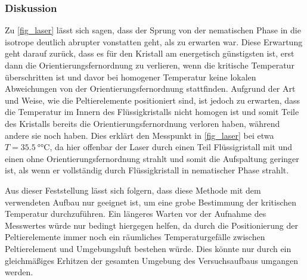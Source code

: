 \documentclass[
	a4paper,
	12pt,
	pagesize,
	ngerman
]{scrartcl}
\begin{document}
	\subsubsection{Diskussion}

	Zu \cref{fig_laser} lässt sich sagen, dass der Sprung von der nematischen Phase in die isotrope deutlich abrupter vonstatten geht, als zu erwarten war.
	Diese Erwartung geht darauf zurück, dass es für den Kristall am energetisch günstigsten ist, erst dann die Orientierungsfernordnung zu verlieren, wenn die kritische Temperatur überschritten ist und davor bei homogener Temperatur keine lokalen Abweichungen von der Orientierungsfernordnung stattfinden. %
	Aufgrund der Art und Weise, wie die Peltierelemente positioniert sind, ist jedoch zu erwarten, dass die Temperatur im Innern des Flüssigkristalls nicht homogen ist und somit Teile des Kristalls bereits die Orientierungsfernordnung verloren haben, während andere sie noch haben.
	Dies erklärt den Messpunkt in \cref{fig_laser} bei etwa $T= \SI{35,5}{\degree \celsius}$, da hier offenbar der Laser durch einen Teil Flüssigristall mit und einen ohne Orientierungsfernordnung strahlt und somit die Aufspaltung geringer ist, als wenn er vollständig durch Flüssigkristall in nematischer Phase strahlt.

	Aus dieser Feststellung lässt sich folgern, dass diese Methode mit dem verwendeten Aufbau nur geeignet ist, um eine grobe Bestimmung der kritischen Temperatur durchzuführen.
	Ein längeres Warten vor der Aufnahme des Messwertes würde nur bedingt hiergegen helfen, da durch die Positionierung der Peltierelemente immer noch ein räumliches Temperaturgefälle zwischen Peltierelement und Umgebungsluft bestehen würde.
	Dies könnte nur durch ein gleichmäßiges Erhitzen der gesamten Umgebung des Versuchsaufbaus umgangen werden.

\end{document}
